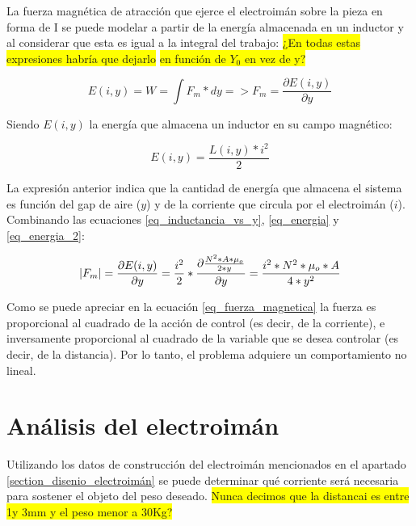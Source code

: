 \noindent La fuerza magnética de atracción que ejerce el electroimán sobre la pieza en forma de I se puede modelar a partir de la energía almacenada en un inductor y al considerar que esta es igual a la integral del trabajo:
\colorbox{yellow}{¿En todas estas expresiones habría que dejarlo}
\noindent
 \colorbox{yellow}{en función de $Y_0$ en vez de y?}

\begin{equation}\label{eq_energia}
	E(i,y)=W=\int{F_{m}*dy}=>F_{m}=\frac{\partial{E(i,y)}}{\partial{y}}
\end{equation}

\noindent Siendo $E(i,y)$ la energía que almacena un inductor en su campo magnético:

\begin{equation}\label{eq_energia_2}
	E(i,y)=\frac{L(i,y)*i^{2}}{2}
\end{equation}

\noindent La expresión anterior indica que la cantidad de energía que almacena el sistema es función del gap de aire ($y$) y de la corriente que circula por el electroimán ($i$). Combinando las ecuaciones \ref{eq_inductancia_vs_y}, \ref{eq_energia} y \ref{eq_energia_2}:

\begin{equation}\label{eq_fuerza_magnetica}
	\lvert F_{m}\rvert=\frac{\partial{E(i,y)}}{\partial{y}}=\frac{i^{2}}{2}*\frac{\partial{\frac{{N^{2}*A*\mu_{o}}}{2*y}}}{\partial{y}}=\frac{i^{2}*N^{2}*\mu_{o}*A}{4*y^{2}}
\end{equation}

\noindent Como se puede apreciar en la ecuación \ref{eq_fuerza_magnetica} la fuerza es proporcional al cuadrado de la acción de control (es decir, de la corriente), e inversamente proporcional al cuadrado de la variable que se desea controlar (es decir, de la distancia). Por lo tanto, el problema adquiere un comportamiento no lineal.


\section{Análisis del electroimán}

\noindent Utilizando los datos de construcción del electroimán mencionados en el apartado \ref{section_disenio_electroimán} se puede determinar qué corriente será necesaria para sostener el objeto del peso deseado.
\colorbox{yellow}{Nunca decimos que la distancai es entre 1y 3mm y el peso menor a 30Kg?}
	
